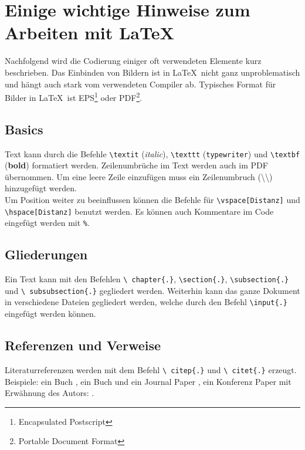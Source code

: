 \chapter{Einige wichtige Hinweise zum Arbeiten mit \LaTeX\ }
\label{sec:latexumg}

Nachfolgend wird die Codierung einiger oft verwendeten Elemente
kurz beschrieben. Das Einbinden von Bildern ist in \LaTeX\ nicht
ganz unproblematisch und hängt auch stark vom verwendeten Compiler
ab. Typisches Format für Bilder in \LaTeX\ ist
EPS\footnote{Encapsulated Postscript} oder PDF\footnote{Portable Document Format}.

\section{Basics}
\label{sec:basics}
Text kann durch die Befehle \texttt{\textbackslash textit} (\textit{italic}), \texttt{\textbackslash texttt}  (\texttt{typewriter}) und \texttt{\textbackslash textbf} (\textbf{bold}) formatiert werden. Zeilenumbrüche im Text werden auch im PDF übernommen. Um eine leere Zeile einzufügen muss ein Zeilenumbruch (\textbackslash \textbackslash) hinzugefügt werden.\\

Um Position weiter zu beeinflussen können die Befehle für \texttt{\textbackslash vspace[Distanz]} und \texttt{\textbackslash hspace[Distanz]} benutzt werden.
Es können auch Kommentare im Code eingefügt werden mit \texttt{\%}.

\section{Gliederungen}
\label{sec:gliederung}

Ein Text kann mit den Befehlen \texttt{\textbackslash
chapter\{.\}}, \texttt{\textbackslash section\{.\}},
\texttt{\textbackslash subsection\{.\}} und \texttt{\textbackslash
subsubsection\{.\}} gegliedert werden. Weiterhin kann das ganze Dokument in verschiedene Dateien gegliedert werden, welche durch den Befehl \texttt{\textbackslash input\{.\}} eingefügt werden können.


\section{Referenzen und Verweise}
\label{sec:refverw}

Literaturreferenzen werden mit dem Befehl \texttt{\textbackslash
citep\{.\}} und \texttt{\textbackslash
citet\{.\}} erzeugt. Beispiele: ein Buch \citep{Raibert1986LeggedRobotsThatBalance}, ein Buch und ein Journal Paper \citep{Raibert1986LeggedRobotsThatBalance,Vukobratovic2004ZeroMomentPoint}, ein Konferenz Paper mit Erwähnung des Autors: \citet{Pratt1995SEA}.

